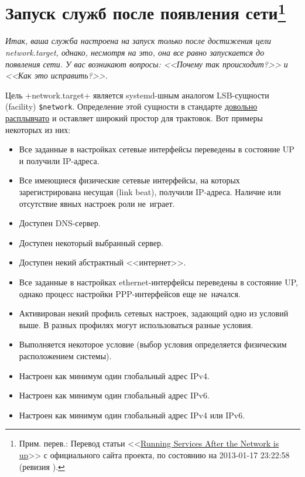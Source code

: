 \documentclass[10pt,oneside,a4paper]{article}
\newcommand{\sfnote}[1]{\texorpdfstring{\protect\footnote%
	{Прим. перев.: #1}}{}}
\begin{document}
\section{Запуск служб после появления сети\sfnote{Перевод статьи
<<\href{http://www.freedesktop.org/wiki/Software/systemd/NetworkTarget}{Running
Services After the Network is up}>> с официального сайта проекта, по состоянию
на 2013-01-17 23:22:58 (ревизия \No17).}}

\emph{Итак, ваша служба настроена на запуск только после достижения цели
network.target, однако, несмотря на это, она все равно запускается до появления
сети. У вас возникают вопросы: <<Почему так происходит?>> и <<Как это
исправить?>>.}

Цель +network.target+ является systemd-шным аналогом LSB-сущности (facility)
\verb+$network+. Определение этой сущности в стандарте
\href{http://refspecs.linuxbase.org/LSB_3.1.1/LSB-Core-generic/LSB-Core-generic/facilname.html}%
{довольно расплывчато} и оставляет широкий простор для трактовок. Вот примеры
некоторых из них:
\begin{itemize}
	\item Все заданные в настройках сетевые интерфейсы переведены в состояние
		UP и получили IP-адреса.
	\item Все имеющиеся физические сетевые интерфейсы, на которых
		зарегистрирована несущая (link beat), получили IP-адреса.
		Наличие или отсутствие явных настроек роли не~играет.
	\item Доступен DNS-сервер.
	\item Доступен некоторый выбранный сервер.
	\item Доступен некий абстрактный <<интернет>>.
	\item Все заданные в настройках ethernet-интерфейсы переведены в
		состояние UP, однако процесс настройки PPP-интерфейсов еще
		не~начался.
	\item Активирован некий профиль сетевых настроек, задающий одно из
		условий выше. В разных профилях могут использоваться разные
		условия.
	\item Выполняется некоторое условие (выбор условия определяется
		физическим расположением системы).
	\item Настроен как минимум один глобальный адрес IPv4.
	\item Настроен как минимум один глобальный адрес IPv6.
	\item Настроен как минимум один глобальный адрес IPv4 или IPv6.
\end{itemize}
\end{document}
